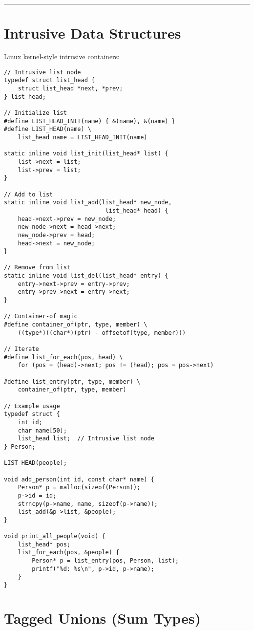 \vspace{0.5cm}
\noindent\rule{\textwidth}{0.4pt}

\section{Intrusive Data Structures}

Linux kernel-style intrusive containers:

\begin{lstlisting}
// Intrusive list node
typedef struct list_head {
    struct list_head *next, *prev;
} list_head;

// Initialize list
#define LIST_HEAD_INIT(name) { &(name), &(name) }
#define LIST_HEAD(name) \
    list_head name = LIST_HEAD_INIT(name)

static inline void list_init(list_head* list) {
    list->next = list;
    list->prev = list;
}

// Add to list
static inline void list_add(list_head* new_node,
                             list_head* head) {
    head->next->prev = new_node;
    new_node->next = head->next;
    new_node->prev = head;
    head->next = new_node;
}

// Remove from list
static inline void list_del(list_head* entry) {
    entry->next->prev = entry->prev;
    entry->prev->next = entry->next;
}

// Container-of magic
#define container_of(ptr, type, member) \
    ((type*)((char*)(ptr) - offsetof(type, member)))

// Iterate
#define list_for_each(pos, head) \
    for (pos = (head)->next; pos != (head); pos = pos->next)

#define list_entry(ptr, type, member) \
    container_of(ptr, type, member)

// Example usage
typedef struct {
    int id;
    char name[50];
    list_head list;  // Intrusive list node
} Person;

LIST_HEAD(people);

void add_person(int id, const char* name) {
    Person* p = malloc(sizeof(Person));
    p->id = id;
    strncpy(p->name, name, sizeof(p->name));
    list_add(&p->list, &people);
}

void print_all_people(void) {
    list_head* pos;
    list_for_each(pos, &people) {
        Person* p = list_entry(pos, Person, list);
        printf("%d: %s\n", p->id, p->name);
    }
}
\end{lstlisting}

\section{Tagged Unions (Sum Types)}

